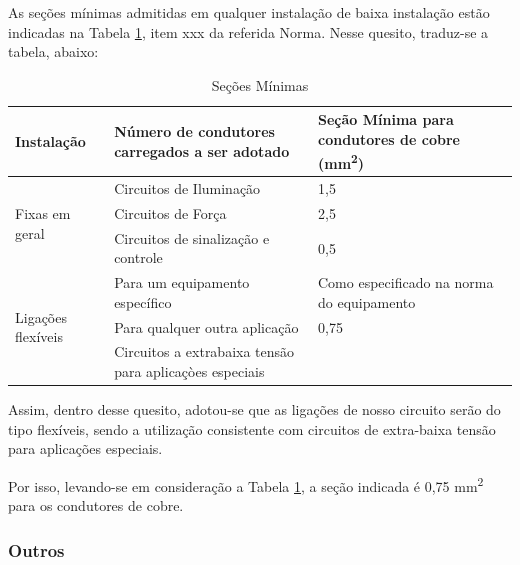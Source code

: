 As seções mínimas admitidas em qualquer instalação de baixa instalação estão indicadas na Tabela \ref{secoes-minimas}, item xxx da referida Norma. Nesse quesito, traduz-se a tabela, abaixo:

\begin{table}[h]
\begin{tabular}{ |l | p{7cm} | p{5cm} |}
\hline
Instalação                          & Número de condutores carregados a ser adotado           & Seção Mínima para condutores de cobre (mm\textsuperscript{2}) \\ \hline
\multirow{3}{*}{Fixas em geral}     & Circuitos de Iluminação                                 & 1,5                                        \\ \cline{2-3}
                                    & Circuitos de Força                                      & 2,5                                        \\ \cline{2-3}
                                    & Circuitos de sinalização e controle                     & 0,5                                        \\ \hline
\multirow{3}{*}{Ligações flexíveis} & Para um equipamento específico                          & Como especificado na norma do equipamento  \\ \cline{2-3}
                                    & Para qualquer outra aplicação                           & 0,75                                       \\ \cline{2-3} 
                                    & Circuitos a extrabaixa tensão para aplicaçòes especiais &                                           
\\ \hline

\end{tabular}
\caption{Seções Mínimas}
\label{secoes-minimas}
\end{table}

Assim, dentro desse quesito, adotou-se que as ligações de nosso circuito serão do tipo flexíveis, sendo a utilização consistente com circuitos de extra-baixa tensão para aplicações especiais. 

Por isso, levando-se em consideração a Tabela \ref{secoes-minimas}, a seção indicada é 0,75 mm\textsuperscript{2} para os condutores de cobre.

\subsubsection{Outros}

